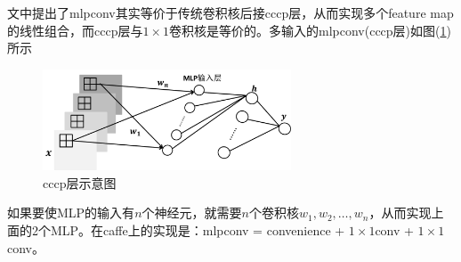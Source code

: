             \par
            文中提出了mlpconv其实等价于传统卷积核后接cccp层，从而实现多个feature map的线性组合，而cccp层与$1\times 1$卷积核是等价的。多输入的mlpconv(cccp层)如图(\ref{fig:cccp层示意图})所示
             \begin{figure}[H]
            \centering
            \includegraphics[height=3cm]{images/cccp_layer.jpg}
            \caption{cccp层示意图}
            \label{fig:cccp层示意图}
            \end{figure}
            如果要使MLP的输入有$n$个神经元，就需要$n$个卷积核$w_1,w_2,\dots,w_n$，从而实现上面的2个MLP。在caffe上的实现是：mlpconv = convenience + $1\times 1$conv + $1\times 1$conv。
